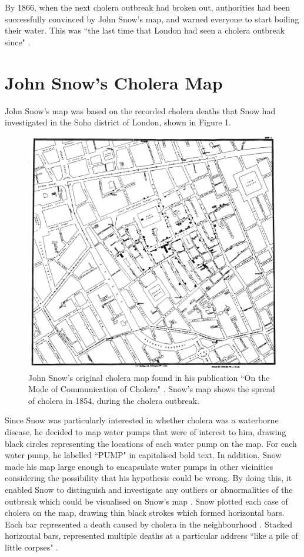 \documentclass[12pt]{article}
\begin{document}
By 1866, when the next cholera outbreak had broken out, authorities had been successfully convinced by John Snow's map, and warned everyone to start boiling their water. This was ``the last time that London had seen a cholera outbreak since" \cite{tedtalk}.

\section{John Snow's Cholera Map}

John Snow's map was based on the recorded cholera deaths that Snow had investigated in the Soho district of London, shown in Figure 1.

\begin{figure}
\centering
\vspace*{-3cm}
\hspace*{-3cm} 
\includegraphics[scale=0.183]{Snow-cholera-map-1}
\caption{John Snow's original cholera map found in his publication ``On the Mode of Communication of Cholera" \cite{original}. Snow's map shows the spread of cholera in 1854, during the cholera outbreak. }
\label{fig:snow}
\end{figure}

Since Snow was particularly interested in whether cholera was a waterborne disease, he decided to map water pumps that were of interest to him, drawing black circles representing the locations of each water pump on the map. For each water pump, he labelled ``PUMP" in capitalised bold text. In addition, Snow made his map large enough to encapsulate water pumps in other vicinities considering the possibility that his hypothesis could be wrong. By doing this, it enabled Snow to distinguish and investigate any outliers or abnormalities of the outbreak which could be visualised on Snow's map \cite{blog}. Snow plotted each case of cholera on the map, drawing thin black strokes which formed horizontal bars. Each bar represented a death caused by cholera in the neighbourhood \cite{tedtalk}. Stacked horizontal bars, represented multiple deaths at a particular address ``like a pile of little corpses" \cite{blog}.
\end{document}
